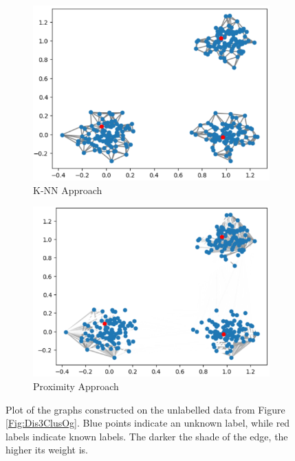 \documentclass[12pt]{amsart}
\begin{document}
\begin{figure}
    \centering
    \begin{subfigure}[b]{0.475\textwidth}
      \includegraphics[width=\textwidth]{Figures/Dis3ClusKNN.png}
      \caption{K-NN Approach}
      \label{Fig:Dis3ClusKNN}
    \end{subfigure}
    \begin{subfigure}[b]{0.475\textwidth}
      \includegraphics[width=\textwidth]{Figures/Dis3ClusProx.png}
      \caption{Proximity Approach}
      \label{Fig:Dis3ClusProx}
    \end{subfigure}
    \caption{
        Plot of the graphs constructed on the unlabelled data from Figure \ref{Fig:Dis3ClusOg}. Blue points indicate an unknown label, while red labels indicate known labels. The darker the shade of the edge, the higher its weight is.
    }
\end{figure}
\end{document}
